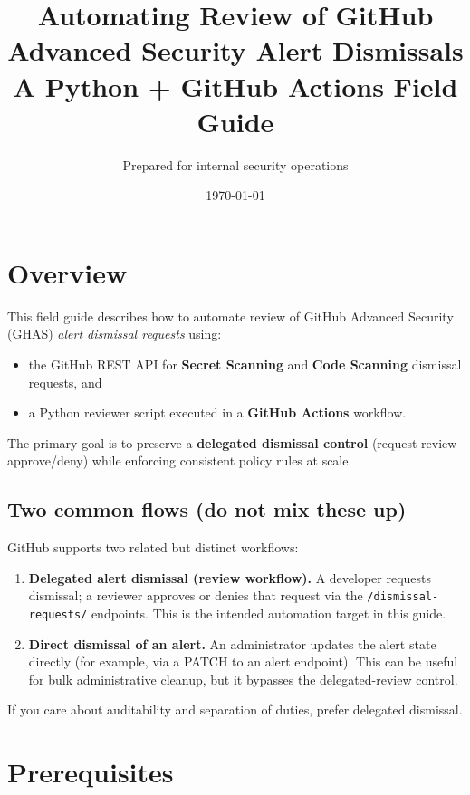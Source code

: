 \documentclass[11pt]{article}
\title{\texorpdfstring{Automating Review of GitHub Advanced Security Alert Dismissals\\\large A Python + GitHub Actions Field Guide}{Automating Review of GitHub Advanced Security Alert Dismissals - A Python + GitHub Actions Field Guide}}
\author{Prepared for internal security operations}
\date{\today}
\begin{document}
\maketitle
\tableofcontents
\clearpage

\section{Overview}

This field guide describes how to automate review of GitHub Advanced Security (GHAS) \emph{alert dismissal requests} using:
\begin{itemize}
  \item the GitHub REST API for \textbf{Secret Scanning} and \textbf{Code Scanning} dismissal requests, and
  \item a Python reviewer script executed in a \textbf{GitHub Actions} workflow.
\end{itemize}

The primary goal is to preserve a \textbf{delegated dismissal control} (request \textrightarrow{} review \textrightarrow{} approve/deny) while enforcing consistent policy rules at scale.

\subsection{Two common flows (do not mix these up)}

GitHub supports two related but distinct workflows:

\begin{enumerate}
  \item \textbf{Delegated alert dismissal (review workflow).}
  A developer requests dismissal; a reviewer approves or denies that request via the \texttt{/dismissal-requests/} endpoints.
  This is the intended automation target in this guide.
  \item \textbf{Direct dismissal of an alert.}
  An administrator updates the alert state directly (for example, via a PATCH to an alert endpoint).
  This can be useful for bulk administrative cleanup, but it bypasses the delegated-review control.
\end{enumerate}

If you care about auditability and separation of duties, prefer delegated dismissal.

\section{Prerequisites}
\end{document}

